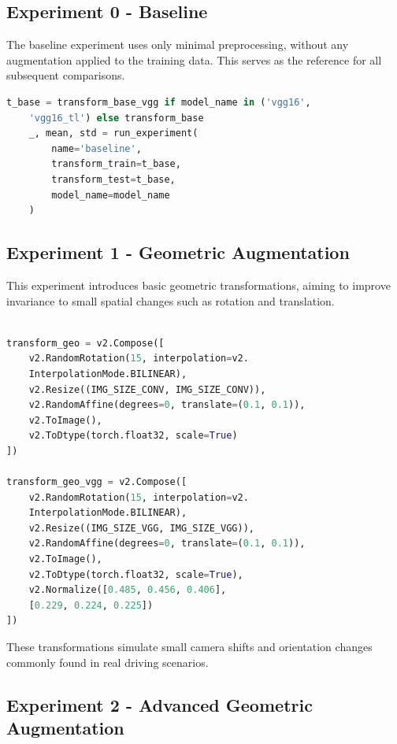 \documentclass[conference,a4paper]{IEEEtran}
\begin{document}
\subsection{Experiment 0 - Baseline}

The baseline experiment uses only minimal preprocessing, without any augmentation applied to the training data. This serves as the reference for all subsequent comparisons.

\begin{lstlisting}[language=Python]
    t_base = transform_base_vgg if model_name in ('vgg16',
    'vgg16_tl') else transform_base
    _, mean, std = run_experiment(
        name='baseline',
        transform_train=t_base,
        transform_test=t_base,
        model_name=model_name
    )
\end{lstlisting}

\subsection{Experiment 1 - Geometric Augmentation}

This experiment introduces basic geometric transformations, aiming to improve invariance to small spatial changes such as rotation and translation.

\begin{lstlisting}[language=Python]

transform_geo = v2.Compose([
    v2.RandomRotation(15, interpolation=v2.
    InterpolationMode.BILINEAR),
    v2.Resize((IMG_SIZE_CONV, IMG_SIZE_CONV)),
    v2.RandomAffine(degrees=0, translate=(0.1, 0.1)),
    v2.ToImage(),
    v2.ToDtype(torch.float32, scale=True)
])

transform_geo_vgg = v2.Compose([
    v2.RandomRotation(15, interpolation=v2.
    InterpolationMode.BILINEAR),
    v2.Resize((IMG_SIZE_VGG, IMG_SIZE_VGG)),
    v2.RandomAffine(degrees=0, translate=(0.1, 0.1)),
    v2.ToImage(),
    v2.ToDtype(torch.float32, scale=True),
    v2.Normalize([0.485, 0.456, 0.406],
    [0.229, 0.224, 0.225])
])

\end{lstlisting}

These transformations simulate small camera shifts and orientation changes commonly found in real driving scenarios.

\subsection{Experiment 2 - Advanced Geometric Augmentation}
\end{document}
